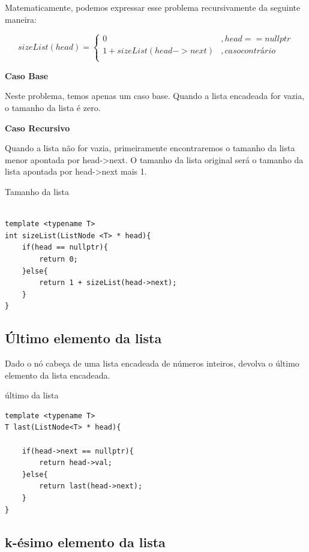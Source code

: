 Matematicamente, podemos expressar esse problema recursivamente da seguinte maneira:


\begin{equation}
sizeList(head) = 
\begin{cases}
0           & , head == nullptr\\
1 + sizeList(head->next)            & , caso contrário\\

\end{cases}
\end{equation}

\textbf{Caso Base}

Neste problema, temos apenas um caso base. Quando a lista encadeada for vazia, o tamanho da lista é zero.

\textbf{Caso Recursivo}

Quando a lista não for vazia, primeiramente encontraremos o tamanho da lista menor apontada por head->next. O tamanho da lista original será o tamanho da lista apontada por head->next mais 1. 



\begin{listing}[!ht]
\caption{Tamanho da lista}
\begin{verbatim}

template <typename T>
int sizeList(ListNode <T> * head){
    if(head == nullptr){
        return 0;
    }else{
        return 1 + sizeList(head->next);
    }
}
\end{verbatim}
\end{listing}

\subsection{Último elemento da lista}

Dado o nó cabeça de uma lista encadeada de números inteiros, devolva o último elemento da lista encadeada.

\begin{listing}[!ht]
\caption{último da lista}
\begin{verbatim}
template <typename T>
T last(ListNode<T> * head){

    if(head->next == nullptr){
        return head->val;
    }else{
        return last(head->next);
    } 
}
\end{verbatim}
\end{listing}


\subsection{k-ésimo elemento da lista}

